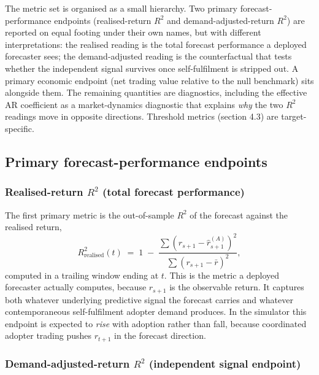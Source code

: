\documentclass[11pt]{article}
\begin{document}
The metric set is organised as a small hierarchy. Two primary forecast-performance endpoints (realised-return $R^{2}$ and demand-adjusted-return $R^{2}$) are reported on equal footing under their own names, but with different interpretations: the realised reading is the total forecast performance a deployed forecaster sees; the demand-adjusted reading is the counterfactual that tests whether the independent signal survives once self-fulfilment is stripped out. A primary economic endpoint (net trading value relative to the null benchmark) sits alongside them. The remaining quantities are diagnostics, including the effective AR coefficient as a market-dynamics diagnostic that explains \emph{why} the two $R^{2}$ readings move in opposite directions. Threshold metrics (section 4.3) are target-specific.

\subsection{Primary forecast-performance endpoints}

\subsubsection{Realised-return $R^{2}$ (total forecast performance)}

The first primary metric is the out-of-sample $R^{2}$ of the forecast against the realised return,
\begin{equation*}
  R^{2}_{\mathrm{realised}}(t) \;=\; 1 \;-\; \frac{\sum (r_{s+1} - \hat{r}^{(A)}_{s+1})^{2}}{\sum (r_{s+1} - \bar{r})^{2}},
\end{equation*}
computed in a trailing window ending at $t$. This is the metric a deployed forecaster actually computes, because $r_{s+1}$ is the observable return. It captures both whatever underlying predictive signal the forecast carries and whatever contemporaneous self-fulfilment adopter demand produces. In the simulator this endpoint is expected to \emph{rise} with adoption rather than fall, because coordinated adopter trading pushes $r_{t+1}$ in the forecast direction.

\subsubsection{Demand-adjusted-return $R^{2}$ (independent signal endpoint)}
\end{document}
